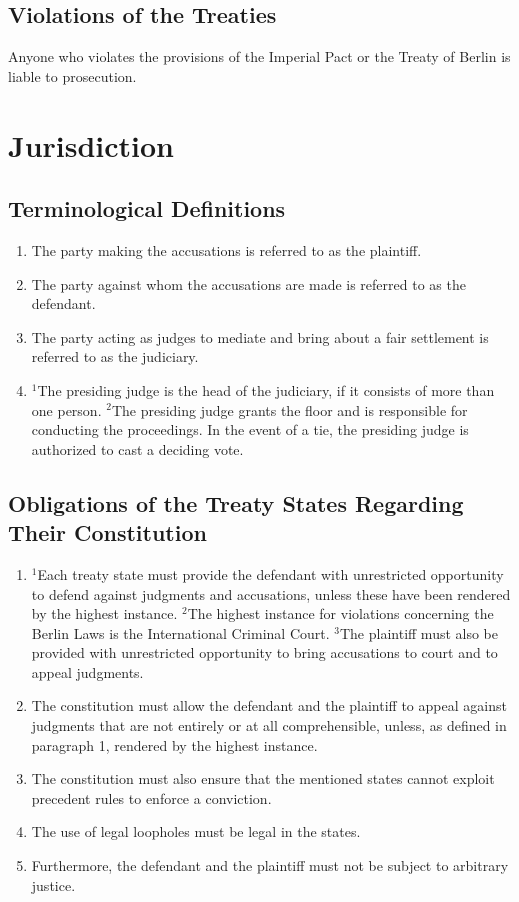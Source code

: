 \documentclass{article}
\begin{document}
\subsection{Violations of the Treaties}
Anyone who violates the provisions of the Imperial Pact or the Treaty of Berlin is liable to prosecution.

\section{Jurisdiction}
\subsection{Terminological Definitions}
\begin{enumerate}[(1)]
    \item The party making the accusations is referred to as the plaintiff.
    \item The party against whom the accusations are made is referred to as the defendant.
    \item The party acting as judges to mediate and bring about a fair settlement is referred to as the judiciary.
    \item ${^1}$The presiding judge is the head of the judiciary, if it consists of more than one person. ${^2}$The presiding judge grants the floor and is responsible for conducting the proceedings. In the event of a tie, the presiding judge is authorized to cast a deciding vote.
\end{enumerate}

\subsection{Obligations of the Treaty States Regarding Their Constitution}
\begin{enumerate}[(1)]
    \item ${^1}$Each treaty state must provide the defendant with unrestricted opportunity to defend against judgments and accusations, unless these have been rendered by the highest instance. ${^2}$The highest instance for violations concerning the Berlin Laws is the International Criminal Court. ${^3}$The plaintiff must also be provided with unrestricted opportunity to bring accusations to court and to appeal judgments.
    \item The constitution must allow the defendant and the plaintiff to appeal against judgments that are not entirely or at all comprehensible, unless, as defined in paragraph 1, rendered by the highest instance.
    \item The constitution must also ensure that the mentioned states cannot exploit precedent rules to enforce a conviction.
    \item The use of legal loopholes must be legal in the states.
    \item Furthermore, the defendant and the plaintiff must not be subject to arbitrary justice.
\end{enumerate}
\end{document}
